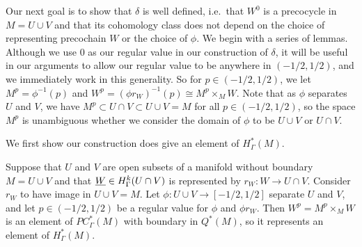 Our next goal is to show that $\delta$ is well defined, i.e.\ that $W^0$ is a precocycle in $M = U \cup V$ and that its cohomology class does not depend on the choice of representing precochain $W$ or the choice of $\phi$.
We begin with a series of lemmas.
Although we use $0$ as our regular value in our construction of $\delta$, it will be useful in our arguments to allow our regular value to be anywhere in $(-1/2,1/2)$, and we immediately work in this generality.
So for $p \in (-1/2,1/2)$, we let $M^p = \phi^{-1}(p)$ and $W^p = (\phi r_W)^{-1}(p) \cong M^p \times_{M} W$.
Note that as $\phi$ separates $U$ and $V$, we have $M^p \subset U \cap V \subset U \cup V = M$ for all $p \in (-1/2,1/2)$, so the space $M^p$ is unambiguous whether we consider the domain of $\phi$ to be $U \cup V$ or $U \cap V$.

We first show our construction does give an element of $H^*_\Gamma(M)$.

\begin{lemma}
	Suppose that $U$ and $V$ are open subsets of a manifold without boundary $M = U \cup V$ and that $\underline{W} \in H^k_\Gamma(U \cap V)$ is represented by $r_W \colon W \to U \cap V$.
	Consider $r_W$ to have image in $U \cup V = M$.
	Let $\phi \colon U \cup V \to [-1/2,1/2]$ separate $U$ and $V$, and let $p \in (-1/2, 1/2)$ be a regular value for $\phi$ and $\phi r_W$.
	Then $W^p = M^p \times_{M} W$ is an element of $PC^*_\Gamma(M)$ with boundary in $Q^*(M)$, so it represents an element of $H^*_\Gamma(M)$.
\end{lemma}

